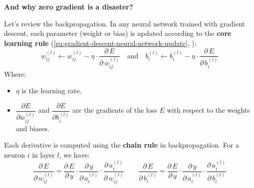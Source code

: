 \highspace
\begin{flushleft}
    \textcolor{Red2}{ \textbf{And why zero gradient is a disaster?}}
\end{flushleft}
Let's review the backpropagation. In any neural network trained with gradient descent, each parameter (weight or bias) is updated according to the \textbf{core learning rule} (\autoref{eq:gradient-descent-neural-network-update}, ):
\begin{equation*}
    w_{ij}^{(l)} \leftarrow w_{ij}^{(l)} - \eta \cdot \dfrac{\partial \, E}{\partial \, w_{ij}^{(l)}} \quad \text{and} \quad
    b_{i}^{(l)} \leftarrow b_{i}^{(l)} - \eta \cdot \dfrac{\partial \, E}{\partial \, b_{i}^{(l)}}
\end{equation*}
Where:
\begin{itemize}
    \item $\eta$ is the learning rate.
    \item $\dfrac{\partial E}{\partial w_{ij}^{(l)}}$ and $\dfrac{\partial E}{\partial b_{i}^{(l)}}$ are the gradients of the loss $E$ with respect to the weights and biases.
\end{itemize}
Each derivative is computed using the \textbf{chain rule} in backpropagation. For a neuron $i$ in layer $l$, we have:
\begin{equation*}
    \dfrac{\partial \, E}{\partial \, w_{ij}^{(l)}} = \dfrac{\partial \, E}{\partial \, y} \cdot \dfrac{\partial \, y}{\partial \, a_{i}^{(l)}} \cdot \dfrac{\partial \, a_{i}^{(l)}}{\partial \, w_{ij}^{(l)}}
    \qquad
    \dfrac{\partial \, E}{\partial \, b_{i}^{(l)}} = \dfrac{\partial \, E}{\partial \, y} \cdot \dfrac{\partial \, y}{\partial \, a_{i}^{(l)}} \cdot \dfrac{\partial \, a_{i}^{(l)}}{\partial \, b_{i}^{(l)}}
\end{equation*}

\newpage

